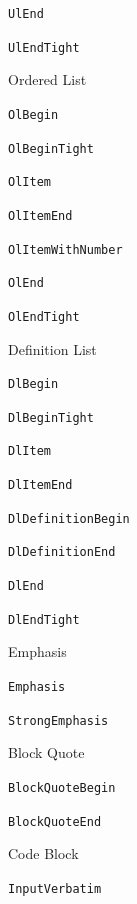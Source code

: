 \documentclass[
  digital,     %
  oneside,     %
  nosansbold,  %
  nocolorbold, %
  lof,         %
  nolot,       %
]{fithesis4}
\begin{document}
\begin{figure}
\begin{multicols}{2}
\begin{compactenum}
\begin{compactenum}
        \item \texttt{UlEnd}
        \item \texttt{UlEndTight}
      \end{compactenum}
      \item Ordered List
      \begin{compactenum}
        \item \texttt{OlBegin}
        \item \texttt{OlBeginTight}
        \item \texttt{OlItem}
        \item \texttt{OlItemEnd}
        \item \texttt{OlItemWithNumber}
        \item \texttt{OlEnd}
        \item \texttt{OlEndTight}
      \end{compactenum}
      \item Definition List
      \begin{compactenum}
        \item \texttt{DlBegin}
        \item \texttt{DlBeginTight}
        \item \texttt{DlItem}
        \item \texttt{DlItemEnd}
        \item \texttt{DlDefinitionBegin}
        \item \texttt{DlDefinitionEnd}
        \item \texttt{DlEnd}
        \item \texttt{DlEndTight}
      \end{compactenum}
      \item Emphasis
      \begin{compactenum}
        \item \texttt{Emphasis}
        \item \texttt{StrongEmphasis}
      \end{compactenum}
      \item Block Quote
      \begin{compactenum}
        \item \texttt{BlockQuoteBegin}
        \item \texttt{BlockQuoteEnd}
      \end{compactenum}
      \item Code Block
      \begin{compactenum}
        \item \texttt{InputVerbatim}

\end{compactenum}
\end{compactenum}
\end{multicols}
\end{figure}
\end{document}
